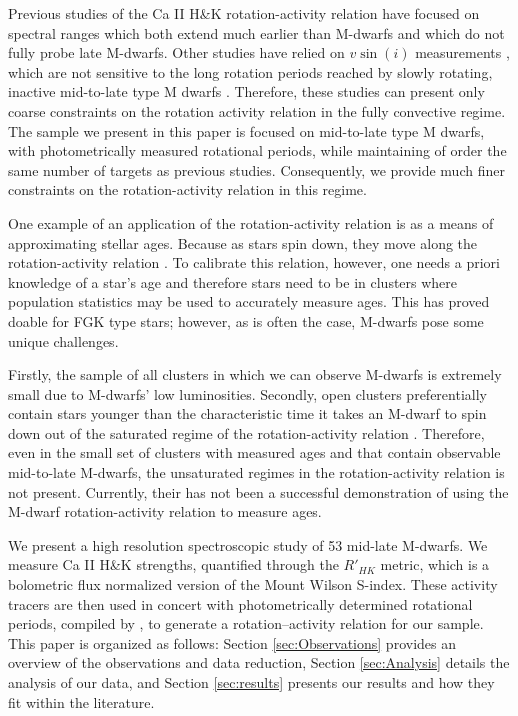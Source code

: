 Previous studies of the Ca II H\&K rotation-activity relation
\citep[e.g.][]{Vau81, Sua15, Def17, Hou17} have focused on spectral ranges
which both extend much earlier than M-dwarfs and which do not fully probe late
M-dwarfs. Other studies have relied on $v\sin(i)$ measurements
\citep[e.g.][]{Browning2010, Hou17}, which are not sensitive to the long
rotation periods reached by slowly rotating, inactive mid-to-late type M dwarfs
\citep[70-150 days:][]{Newton2016}. Therefore, these studies can present only
coarse constraints on the rotation activity relation in the fully convective
regime. The sample we present in this paper is focused on mid-to-late type M
dwarfs, with photometrically measured rotational periods, while maintaining of
order the same number of targets as previous studies.  Consequently, we provide
much finer constraints on the rotation-activity relation in this regime. 

One example of an application of the rotation-activity relation is as a means
of approximating stellar ages. Because as stars spin down, they move along
the rotation-activity relation \citep{Soderblom1991}. To calibrate this
relation, however, one needs a priori knowledge of a star's age and therefore
stars need to be in clusters where population statistics may be used to
accurately measure ages. This has proved doable for FGK type stars; however,
as is often the case, M-dwarfs pose some unique challenges. 

Firstly, the sample of all clusters in which we can observe M-dwarfs is
extremely small due to M-dwarfs' low luminosities. Secondly, open clusters
preferentially contain stars younger than the characteristic time it takes an
M-dwarf to spin down out of the saturated regime of the rotation-activity
relation \citep{West2009, Newton2016, Giacobbe2020}. Therefore, even in the
small set of clusters with measured ages and that contain observable
mid-to-late M-dwarfs, the unsaturated regimes in the rotation-activity
relation is not present. Currently, their has not been a successful
demonstration of using the M-dwarf rotation-activity relation to measure
ages.

We present a high resolution spectroscopic study of 53 mid-late M-dwarfs. We
measure Ca II H\&K strengths, quantified through the $R'_{HK}$ metric, which is
a bolometric flux normalized version of the Mount Wilson S-index. These
activity tracers are then used in concert with photometrically determined
rotational periods, compiled by \citet{Newton2017}, to generate a
rotation--activity relation for our sample. This paper is organized as follows:
Section \ref{sec:Observations} provides an overview of the observations and
data reduction, Section \ref{sec:Analysis} details the analysis of our data,
and Section \ref{sec:results} presents our results and how they fit within the
literature. 
